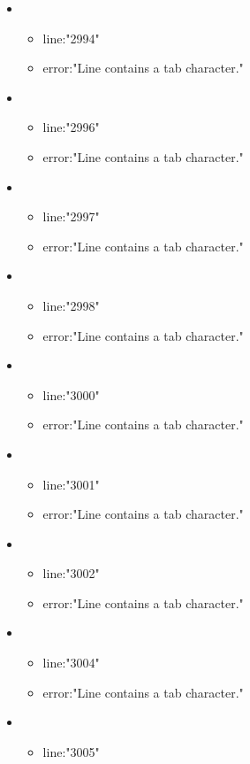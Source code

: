 \begin{itemize}
	\item 
	\begin{itemize} 
		\item line:"2994" 
		\item error:"Line contains a tab character." 
	\end{itemize}
	\item 
	\begin{itemize} 
		\item line:"2996" 
		\item error:"Line contains a tab character." 
	\end{itemize}
	\item 
	\begin{itemize} 
		\item line:"2997" 
		\item error:"Line contains a tab character." 
	\end{itemize}
	\item 
	\begin{itemize} 
		\item line:"2998" 
		\item error:"Line contains a tab character." 
	\end{itemize}
	\item 
	\begin{itemize} 
		\item line:"3000" 
		\item error:"Line contains a tab character." 
	\end{itemize}
	\item 
	\begin{itemize} 
		\item line:"3001" 
		\item error:"Line contains a tab character." 
	\end{itemize}
	\item 
	\begin{itemize} 
		\item line:"3002" 
		\item error:"Line contains a tab character." 
	\end{itemize}
	\item 
	\begin{itemize} 
		\item line:"3004" 
		\item error:"Line contains a tab character." 
	\end{itemize}
	\item 
	\begin{itemize} 
		\item line:"3005" 

\end{itemize}
\end{itemize}
